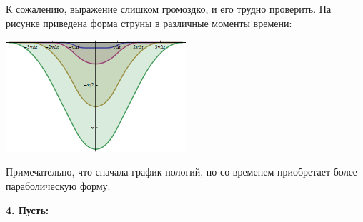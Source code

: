 К сожалению, выражение слишком громоздко, и его трудно проверить. На рисунке приведена форма струны в различные моменты времени:
\begin{center}
	\includegraphics[width=0.5\textwidth]{images/png/for_const_force.png}
\end{center}
Примечательно, что сначала график пологий, но со временем приобретает более параболическую форму.

\textbf{4. Пусть:}

